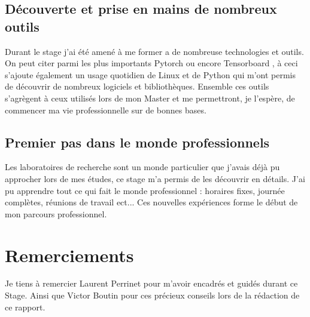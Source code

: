 \documentclass[11pt,francais]{article}
\begin{document}
\subsection{Découverte et prise en mains de nombreux outils}
Durant le stage j'ai été amené à me former a de nombreuse technologies et outils. On peut citer parmi les plus importants Pytorch \cite{paszke2017automatic} ou encore Tensorboard \cite{tensorflow2015-whitepaper}, à ceci s'ajoute également un usage quotidien de Linux et de Python qui m'ont permis de découvrir de nombreux logiciels et bibliothèques. Ensemble ces outils s'agrègent à ceux utilisés lors de mon Master et me permettront, je l'espère, de commencer ma vie professionnelle sur de bonnes bases.

\subsection{Premier pas dans le monde professionnels}
Les laboratoires de recherche sont un monde particulier que j'avais déjà pu approcher lors de mes études, ce stage m'a permis de les découvrir en détails. J'ai pu apprendre tout ce qui fait le monde professionnel : horaires fixes, journée complètes, réunions de travail ect... 
Ces nouvelles expériences forme le début de mon parcours professionnel.

\newpage


\section*{Remerciements}
Je tiens à remercier Laurent Perrinet pour m'avoir encadrés et guidés durant ce Stage.
Ainsi que Victor Boutin pour ces précieux conseils lors de la rédaction de ce rapport.



\newpage
\end{document}
